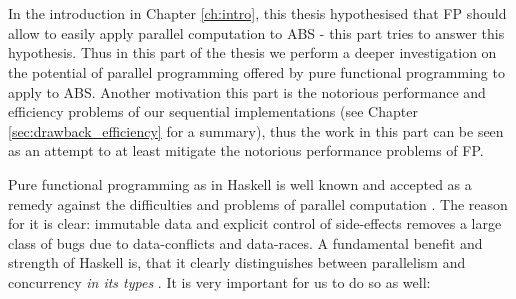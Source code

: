 \chapter*{} %
\label{ch:parallel_abs}
In the introduction in Chapter \ref{ch:intro}, this thesis hypothesised that FP should allow to easily apply parallel computation to ABS - this part tries to answer this hypothesis. Thus in this part of the thesis we perform a deeper investigation on the potential of parallel programming offered by pure functional programming to apply to ABS. Another motivation this part is the notorious performance and efficiency problems of our sequential implementations (see Chapter \ref{sec:drawback_efficiency} for a summary), thus the work in this part can be seen as an attempt to at least mitigate the notorious performance problems of FP.

Pure functional programming as in Haskell is well known and accepted as a remedy against the difficulties and problems of parallel computation \cite{hudak_history_2007}. The reason for it is clear: immutable data and explicit control of side-effects removes a large class of bugs due to data-conflicts and data-races. A fundamental benefit and strength of Haskell is, that it clearly distinguishes between parallelism and concurrency \textit{in its types} \cite{jones_tackling_2002}. It is very important for us to do so as well:

